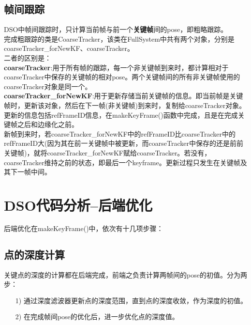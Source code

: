 \section{帧间跟踪}	
\vspace{0.2em}
DSO中帧间跟踪时，只计算当前帧与前一个\textbf{关键帧}间的pose，即粗略跟踪。\\
\indent 完成粗跟踪的类是CoarseTracker，该类在FullSystem中共有两个对象，分别是coarseTracker\_forNewKF、coarseTracker。\\
二者的区别是：\\
\textbf{coarseTracker}:用于所有帧的跟踪，每一个非关键帧到来时，都计算相对于coarseTracker中保存的关键帧的相对pose。两个关键帧间的所有非关键帧使用的coarseTracker对象是同一个。\\
\textbf{coarseTracker\_forNewKF}:用于更新存储当前关键帧的信息。即当前帧是关键帧时，更新该对象，然后在下一帧(非关键帧)到来时，复制给coarseTracker对象。更新的信息包括refFrameID信息，在makeKeyFrame()函数中完成，且是在完成关键帧之后和边缘化之前。\\
\indent 新帧到来时，若coarseTracker\_forNewKF中的refFrameID比coarseTracker中的refFrameID大(因为其在前一关键帧中被更新，而coarseTracker中保存的还是前前关键帧)，就将coarseTracker\_forNewKF赋给coarseTracker。若没有，coarseTracker维持之前的状态，即最后一个keyframe。更新过程只发生在关键帧及其下一帧中间。






\chapter{DSO代码分析--后端优化}
后端优化在makeKeyFrame()中，依次有十几项步骤：



\section{点的深度计算}
关键点的深度的计算都在后端完成，前端之负责计算两帧间的pose的初值。分为两步：
\begin{itemize}
	\item [1)] 通过深度滤波器更新点的深度范围，直到点的深度收敛，作为深度的初值。
	\item [2)] 在完成帧间pose的优化后，进一步优化点的深度值。
\end{itemize} 


